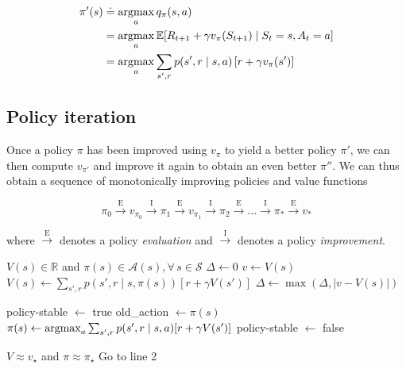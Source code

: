 \begin{align*}
    \pi'(s) &\doteq \operatorname*{argmax}_a q_\pi(s,a) \\
            &= \operatorname*{argmax}_a \mathbb{E}[R_{t+1} + \gamma v_\pi(S_{t+1}) \mid S_t = s, A_t = a] \\
            &= \operatorname*{argmax}_a \sum_{s', r} p(s', r \mid s, a) \left[r+\gamma v_\pi(s')\right]
\end{align*}

\subsection{Policy iteration}
Once a policy $\pi$ has been improved using $v_\pi$ to yield a better policy $\pi'$, we can then compute $v_{\pi'}$ and improve it again to obtain an even better $\pi''$. We can thus obtain a sequence of monotonically improving policies and value functions

\[
  \pi_0 \xrightarrow{\text{E}} v_{\pi_0} 
        \xrightarrow{\text{I}} \pi_1 
        \xrightarrow{\text{E}} v_{\pi_1} 
        \xrightarrow{\text{I}} \pi_2 
        \xrightarrow{\text{E}} \dots 
        \xrightarrow{\text{I}} \pi_* 
        \xrightarrow{\text{E}} v_*
\]

where $\xrightarrow{\text{E}}$ denotes a policy \emph{evaluation} and $\xrightarrow{\text{I}}$ denotes a policy \emph{improvement}.

\begin{algorithm}
    \caption{Policy iteration for estimating $\pi \approx \pi_\star$}
    \begin{algorithmic}[1]
        \State $V(s) \in \mathbb{R}$ and $\pi(s) \in \mathcal{A}(s), \forall \, s \in \mathcal{S}$
        \Repeat {}
        \State $\Delta \gets 0$
            \State $v \gets V(s)$
            \State $V(s) \gets \sum_{s',r} p(s',r \mid s, \pi(s))[r + \gamma V(s')]$
            \State $\Delta \gets \max(\Delta, |v - V(s)|)$
        \EndFor
        \Until{$\Delta < \theta$}

        \State policy-stable $\gets$ true 
            \State old\_action $\gets \pi(s)$
            \State $ \pi(s) \gets \operatorname*{argmax}_a \sum_{s', r} p(s', r \mid s, a) [r+\gamma V(s')]$
                \State policy-stable $\gets$ false
            \EndIf
        \EndFor

            \State \Return $V \approx v_\star$ and $\pi \approx \pi_\star$
        \Else
            \State Go to line 2
        \EndIf
    \end{algorithmic}
\end{algorithm}

